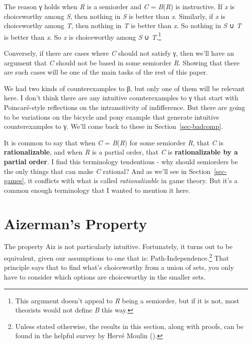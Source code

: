 \documentclass[
  11pt,
  letterpaper,
  DIV=11,
  numbers=noendperiod,
  twoside]{scrartcl}
\begin{document}
The reason γ holds when \emph{R} is a semiorder and \emph{C} =
\emph{B}(\emph{R}) is instructive. If \emph{x} is choiceworthy among
\emph{S}, then nothing in \emph{S} is better than \emph{x}. Similarly,
if \emph{x} is choiceworthy among \emph{T}, then nothing in \emph{T} is
better than \emph{x}. So nothing in \emph{S} ∪ \emph{T} is better than
\emph{x}. So \emph{x} is choiceworthy among \emph{S} ∪
\emph{T}.\footnote{This argument doesn't appeal to \emph{R} being a
  semiorder, but if it is not, most theorists would not define \emph{B}
  this way.}

Conversely, if there are cases where \emph{C} should not satisfy γ, then
we'll have an argument that \emph{C} should not be based in some
semiorder \emph{R}. Showing that there are such cases will be one of the
main tasks of the rest of this paper.

We had two kinds of counterexamples to β, but only one of them will be
relevant here. I don't think there are any intuitive counterexamples to
γ that start with Poincaré-style reflections on the intransitivity of
indifference. But there are going to be variations on the bicycle and
pony example that generate intuitive counterexamples to γ. We'll come
back to these in Section~\ref{sec-badcomp}.

It is common to say that when \emph{C} = \emph{B}(\emph{R}) for some
semiorder \emph{R}, that \emph{C} is \textbf{rationalizable}, and when
\emph{R} is a partial order, that \emph{C} is \textbf{rationalizable by
a partial order}. I find this terminology tendentious - why should
semiorders be the only things that can make \emph{C} rational? And as
we'll see in Section~\ref{sec-games}, it conflicts with what is called
\emph{rationalizable} in game theory. But it's a common enough
terminology that I wanted to mention it here.

\section{Aizerman's Property}\label{sec-aiz}

The property Aiz is not particularly intuitive. Fortunately, it turns
out to be equivalent, given our assumptions to one that is:
Path-Independence.\footnote{Unless stated otherwise, the results in this
  section, along with proofs, can be found in the helpful survey by
  Hervé Moulin ().} That principle says
that to find what's choiceworthy from a union of sets, you only have to
consider which options are choiceworthy in the smaller sets.
\end{document}
